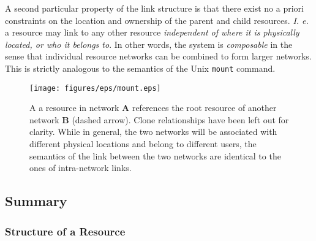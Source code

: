 \documentclass[11pt]{article}
\begin{document}
\begin{mainmatter}
A second particular property of the link structure is that there exist no a priori constraints on the location and ownership of the parent and child resources. \emph{I. e.} a resource may link to any other resource \emph{independent of where it is physically located, or who it belongs to}. In other words, the system is \emph{composable} in the sense that individual resource networks can be combined to form larger networks. This is strictly analogous to the semantics of the Unix \texttt{mount} command.


\begin{figure}[ht!]
\texttt{[image: figures/eps/mount.eps]}
\caption{
A a resource in network \textbf{A} references the root resource of another network \textbf{B} (dashed arrow). Clone relationships have been left out for clarity. While in general, the two networks will be associated with different physical locations and belong to different users, the semantics of the link between the two networks are identical to the ones of intra-network links. 
}
\end{figure}

\subsection{Summary}

\subsubsection{Structure of a Resource}


\end{mainmatter}
\end{document}
